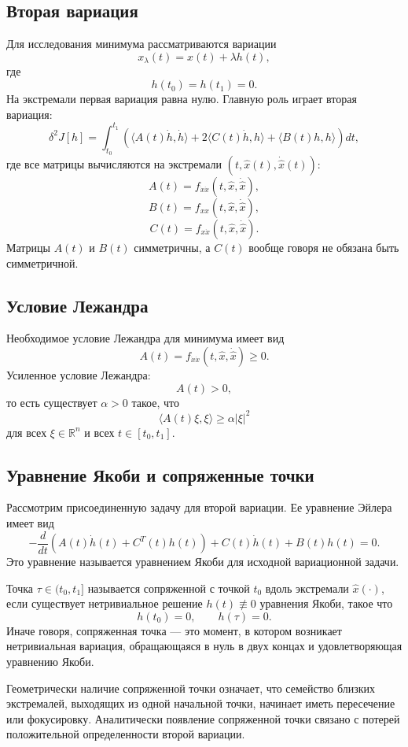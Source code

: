 \documentclass[12pt,a4paper]{article}
\begin{document}
\subsection*{Вторая вариация}
Для исследования минимума рассматриваются вариации
\[
x_\lambda(t)=\widehat x(t)+\lambda h(t),
\]
где
\[
h(t_0)=h(t_1)=0.
\]
На экстремали первая вариация равна нулю. Главную роль играет вторая вариация:
\[
\delta^2J[h]
=
\int_{t_0}^{t_1}
\left(
\langle A(t)\dot h,\dot h\rangle
+
2\langle C(t)\dot h,h\rangle
+
\langle B(t)h,h\rangle
\right)dt,
\]
где все матрицы вычисляются на экстремали $(t,\widehat x(t),\dot{\widehat x}(t))$:
\[
A(t)=f_{\dot x\dot x}(t,\widehat x,\dot{\widehat x}),
\]
\[
B(t)=f_{xx}(t,\widehat x,\dot{\widehat x}),
\]
\[
C(t)=f_{x\dot x}(t,\widehat x,\dot{\widehat x}).
\]
Матрицы $A(t)$ и $B(t)$ симметричны, а $C(t)$ вообще говоря не обязана быть симметричной.

\subsection*{Условие Лежандра}
Необходимое условие Лежандра для минимума имеет вид
\[
A(t)=f_{\dot x\dot x}(t,\widehat x,\dot{\widehat x})\ge0.
\]
Усиленное условие Лежандра:
\[
A(t)>0,
\]
то есть существует $\alpha>0$ такое, что
\[
\langle A(t)\xi,\xi\rangle\ge \alpha|\xi|^2
\]
для всех $\xi\in\mathbb R^n$ и всех $t\in[t_0,t_1]$.

\subsection*{Уравнение Якоби и сопряженные точки}
Рассмотрим присоединенную задачу для второй вариации. Ее уравнение Эйлера имеет вид
\[
-\frac{d}{dt}\left(A(t)\dot h(t)+C^T(t)h(t)\right)
+
C(t)\dot h(t)+B(t)h(t)=0.
\]
Это уравнение называется уравнением Якоби для исходной вариационной задачи.

Точка $\tau\in(t_0,t_1]$ называется сопряженной с точкой $t_0$ вдоль экстремали $\widehat x(\cdot)$, если существует нетривиальное решение $h(t)\not\equiv0$ уравнения Якоби, такое что
\[
h(t_0)=0,\qquad h(\tau)=0.
\]
Иначе говоря, сопряженная точка --- это момент, в котором возникает нетривиальная вариация, обращающаяся в нуль в двух концах и удовлетворяющая уравнению Якоби.

Геометрически наличие сопряженной точки означает, что семейство близких экстремалей, выходящих из одной начальной точки, начинает иметь пересечение или фокусировку. Аналитически появление сопряженной точки связано с потерей положительной определенности второй вариации.
\end{document}
